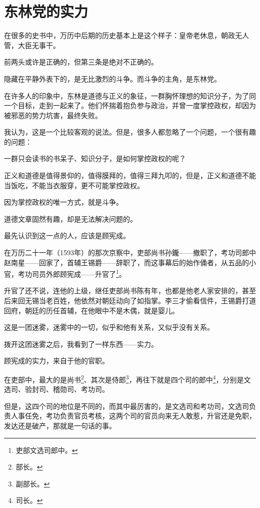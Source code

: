 \fi
\newpage
\section{东林党的实力}
\ifnum{}
	\begin{multicols}{\theparacolNo}
		\fi
		在很多的史书中，万历中后期的历史基本上是这个样子：皇帝老休息，朝政无人管，大臣无事干。

		前两头或许是正确的，但第三条是绝对不正确的。

		隐藏在平静外表下的，是无比激烈的斗争。而斗争的主角，是东林党。

		在许多人的印象中，东林是道德与正义的象征，一群胸怀理想的知识分子，为了同一个目标，走到一起来了。他们怀揣着抱负参与政治，并曾一度掌控政权，却因为被邪恶的势力坑害，最终失败。

		我认为，这是一个比较客观的说法。但是，很多人都忽略了一个问题，一个很有趣的问题：

		一群只会读书的书呆子、知识分子，是如何掌控政权的呢？

		正义和道德是值得景仰的，值得膜拜的，值得三拜九叩的，但是，正义和道德不能当饭吃，不能当衣服穿，更不可能掌控政权。

		因为掌控政权的唯一方式，就是斗争。

		道德文章固然有趣，却是无法解决问题的。

		最先认识到这一点的人，应该是顾宪成。

		在万历二十一年（1593年）的那次京察中，吏部尚书孙鑨——撤职了，考功司郎中赵南星——回家了，首辅王锡爵——辞职了，而这事幕后的始作俑者，从五品的小官，考功司员外郎顾宪成——升官了\footnote{吏部文选司郎中。}。

		升官了还不说，连他的上级，继任吏部尚书陈有年，也都是他老人家安排的，甚至后来回无锡当老百姓，他依然对朝廷动向了如指掌。李三才偷看信件，王锡爵打道回府，朝廷的历任首辅，在他眼中不是木偶，就是婴儿。

		这是一团迷雾，迷雾中的一切，似乎和他有关系，又似乎没有关系。

		拨开这团迷雾之后，我看到了一样东西——实力。

		顾宪成的实力，来自于他的官职。

		在吏部中，最大的是尚书\footnote{部长。}、其次是侍郎\footnote{副部长。}，再往下就是四个司的郎中\footnote{司长。}，分别是文选司、验封司、稽勋司、考功司。

		但是，这四个司的地位是不同的，而其中最厉害的，是文选司和考功司，文选司负责人事任免，考功负责官员考核，这两个司的官员向来无人敢惹，升官还是免职，发达还是破产，那就是一句话的事。


\end{multicols}
